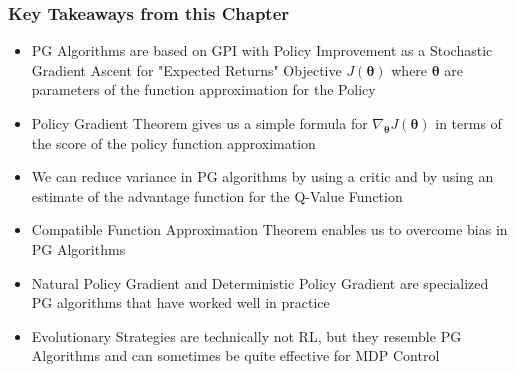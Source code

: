 \documentclass[handout]{beamer}
\begin{document}
\begin{frame}
\frametitle{Key Takeaways from this Chapter}
\pause
\begin{itemize}[<+->]
\item PG Algorithms are based on GPI with Policy Improvement as a Stochastic Gradient Ascent for "Expected Returns" Objective $J(\bm{\theta})$ where $\bm{\theta}$ are parameters of the function approximation for the Policy
\item Policy Gradient Theorem gives us a simple formula for $\nabla_{\bm{\theta}} J(\bm{\theta})$ in terms of the score of the policy function approximation
\item We can reduce variance in PG algorithms by using a critic and by using an estimate of the advantage function for the Q-Value Function
\item Compatible Function Approximation Theorem enables us to overcome bias in PG Algorithms
\item Natural Policy Gradient and Deterministic Policy Gradient are specialized PG algorithms that have worked well in practice
\item Evolutionary Strategies are technically not RL, but they resemble PG Algorithms and can sometimes be quite effective for MDP Control
\end{itemize}
\end{frame}
\end{document}
